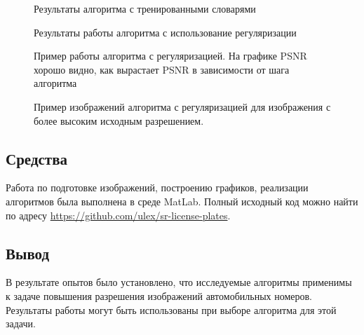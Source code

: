 \begin{figure}[p]
  \centering
  
  \caption{Результаты алгоритма с тренированными словарями }
  \label{fig:plot_sr1}
\end{figure}

\begin{figure}[p]
  \centering
  
  \caption{Результаты работы алгоритма с использование регуляризации \label{plot_sr2}}
\end{figure}

\begin{figure}[p]
  \centering
  
  \caption{Пример работы алгоритма с регуляризацией. На графике PSNR хорошо видно, как вырастает PSNR в зависимости
    от шага алгоритма \label{plot_sr2_rising_low}}
\end{figure}

 \begin{figure}[p]
   \centering
   
   \caption{Пример изображений алгоритма с регуляризацией для изображения с более высоким исходным разрешением.
     \label{plot_sr2_rising_high}}
 \end{figure}


\subsection{Средства}
Работа по подготовке изображений, построению графиков, реализации алгоритмов была выполнена в среде MatLab. Полный
исходный код можно найти по адресу \url{https://github.com/ulex/sr-license-plates}.



\subsection{Вывод}
В результате опытов было установлено, что исследуемые алгоритмы применимы к задаче повышения разрешения изображений
автомобильных номеров. Результаты работы могут быть использованы при выборе алгоритма для этой задачи.

\newpage
\nocite{*}



